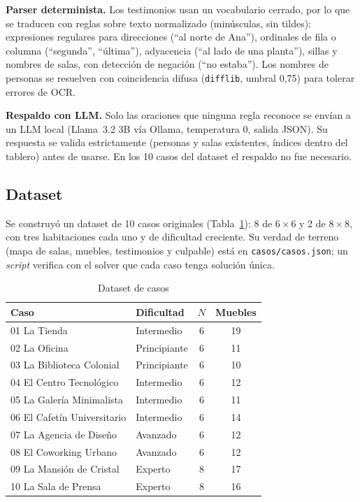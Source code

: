 \documentclass[conference,a4paper]{IEEEtran}
\begin{document}
\textbf{Parser determinista.} Los testimonios usan un vocabulario cerrado, por lo que se
traducen con reglas sobre texto normalizado (minúsculas, sin tildes): expresiones regulares
para direcciones (``al norte de Ana''), ordinales de fila o columna (``segunda'',
``última''), adyacencia (``al lado de una planta''), sillas y nombres de salas, con
detección de negación (``no estaba''). Los nombres de personas se resuelven con
coincidencia difusa (\texttt{difflib}, umbral 0,75) para tolerar errores de OCR.

\textbf{Respaldo con LLM.} Solo las oraciones que ninguna regla reconoce se envían a un LLM
local (Llama~3.2 3B vía Ollama, temperatura 0, salida JSON). Su respuesta se valida
estrictamente (personas y salas existentes, índices dentro del tablero) antes de usarse. En
los 10 casos del dataset el respaldo no fue necesario.

\subsection{Dataset}
Se construyó un dataset de 10 casos originales (Tabla~\ref{tab:dataset}): 8 de $6\times6$ y
2 de $8\times8$, con tres habitaciones cada uno y de dificultad creciente. Su verdad de
terreno (mapa de salas, muebles, testimonios y culpable) está en \texttt{casos/casos.json};
un \emph{script} verifica con el solver que cada caso tenga solución única.

\begin{table}[t]
\centering
\caption{Dataset de casos}
\label{tab:dataset}
\begin{tabular}{llcc}
\toprule
\textbf{Caso} & \textbf{Dificultad} & $N$ & \textbf{Muebles}\\
\midrule
01 La Tienda              & Intermedio   & 6 & 19\\
02 La Oficina             & Principiante & 6 & 11\\
03 La Biblioteca Colonial & Principiante & 6 & 10\\
04 El Centro Tecnológico  & Intermedio   & 6 & 12\\
05 La Galería Minimalista & Intermedio   & 6 & 11\\
06 El Cafetín Universitario & Intermedio & 6 & 14\\
07 La Agencia de Diseño   & Avanzado     & 6 & 12\\
08 El Coworking Urbano    & Avanzado     & 6 & 12\\
09 La Mansión de Cristal  & Experto      & 8 & 17\\
10 La Sala de Prensa      & Experto      & 8 & 16\\
\bottomrule
\end{tabular}
\end{table}
\end{document}
